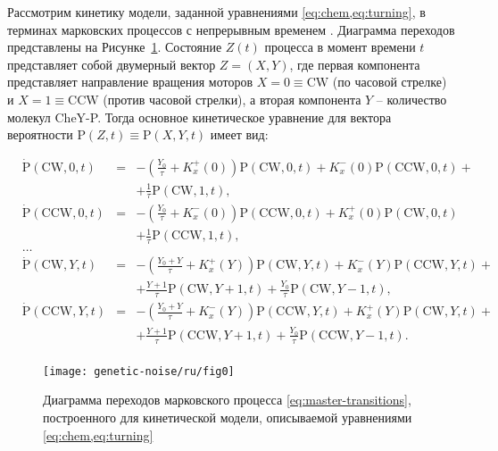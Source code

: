Рассмотрим кинетику модели, заданной уравнениями \cref{eq:chem,eq:turning}, в терминах марковских процессов с непрерывным временем \cite{tikhonov_markov_process_1977}. Диаграмма переходов представлены на Рисунке~\cref{fig:transitions}. Состояние $Z(t)$ процесса в момент времени $t$ представляет собой двумерный вектор $Z = (X, Y)$, где первая компонента представляет направление вращения моторов $X = 0 \equiv \mathrm{CW}$ (по часовой стрелке) и $X = 1 \equiv \mathrm{CCW}$ (против часовой стрелки), а вторая компонента $Y$ -- количество молекул CheY-P. Тогда основное кинетическое уравнение для вектора вероятности $\mathrm{P}(Z, t) \equiv \mathrm{P}(X, Y, t)$ имеет вид:

\begin{equation}
    \begin{aligned}
        &\dot{\mathrm{P}}(\mathrm{CW},0,t)&=&-\left (\frac{Y_0}{\tau} + K_x^+(0) \right ) \mathrm{P}(\mathrm{CW},0,t) + K_x^-(0) \mathrm{P}(\mathrm{CCW},0,t)+&&\\
        &&&+\frac{1}{\tau}\mathrm{P}(\mathrm{CW},1,t),&&\\
        &\dot{\mathrm{P}}(\mathrm{CCW},0,t)&=&-\left (\frac{Y_0}{\tau} + K_x^-(0) \right ) \mathrm{P}(\mathrm{CCW},0,t) + K_x^+(0) \mathrm{P}(\mathrm{CW},0,t)&&\\
        &&&+\frac{1}{\tau}\mathrm{P}(\mathrm{CCW},1,t),&&\\
        &\dots&&\\
        &\dot{\mathrm{P}}(\mathrm{CW},Y,t)&=&-\left (\frac{Y_0+Y}{\tau} + K_x^+(Y) \right ) \mathrm{P}(\mathrm{CW},Y,t) + K_x^-(Y) \mathrm{P}(\mathrm{CCW},Y,t)+&&\\
        &&&+\frac{Y+1}{\tau}\mathrm{P}(\mathrm{CW},Y+1,t)+\frac{Y_0}{\tau}\mathrm{P}(\mathrm{CW},Y-1,t),&&\\
        &\dot{\mathrm{P}}(\mathrm{CCW},Y,t)&=&-\left (\frac{Y_0+Y}{\tau} + K_x^-(Y) \right ) \mathrm{P}(\mathrm{CCW},Y,t) + K_x^+(Y) \mathrm{P}(\mathrm{CW},Y,t)+&&\\
        &&&+\frac{Y+1}{\tau}\mathrm{P}(\mathrm{CCW},Y+1,t)+\frac{Y_0}{\tau}\mathrm{P}(\mathrm{CCW},Y-1,t).&&\\
    \end{aligned}
    \label{eq:master-transitions}
\end{equation}


\begin{figure}[ht]
    \centering
    \texttt{[image: genetic-noise/ru/fig0]}
    \caption{
        Диаграмма переходов марковского процесса \cref{eq:master-transitions}, построенного для кинетической модели, описываемой уравнениями \cref{eq:chem,eq:turning}
    }
    \label{fig:transitions}
\end{figure}

